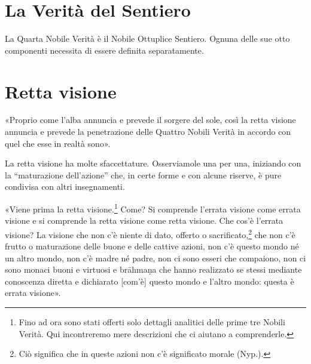 

\hypertarget{x-la-verità-del-sentiero}{\section*{La Verità del Sentiero}}
 La Quarta Nobile Verità è il Nobile Ottuplice
Sentiero. Ognuna delle sue otto componenti necessita di essere definita
separatamente.


\hypertarget{x-retta-visione}{\section*{Retta visione}}
 «Proprio come l’alba annuncia e prevede il sorgere del sole,
così la retta visione annuncia e prevede la penetrazione delle Quattro
Nobili Verità in accordo con quel che esse in realtà sono».




 La retta visione ha molte sfaccettature. Osserviamole
una per una, iniziando con la “maturazione dell’azione” che, in certe
forme e con alcune riserve, è pure condivisa con altri insegnamenti.


 «Viene prima la retta visione.\footnote{Fino ad ora sono stati offerti solo dettagli analitici delle prime tre Nobili Verità. Qui incontreremo mere descrizioni che ci aiutano a comprenderle.} Come? Si
comprende l’errata visione come errata visione e si comprende la retta
visione come retta visione. Che cos’è l’errata visione? La visione che
non c’è niente di dato, offerto o sacrificato,\footnote{Ciò significa che in queste azioni non c’è significato morale (Nyp.).} che
non c’è frutto o maturazione delle buone e delle cattive azioni, non c’è
questo mondo né un altro mondo, non c’è madre né padre, non ci sono
esseri che compaiono, non ci sono monaci buoni e virtuosi e brāhmaṇa che
hanno realizzato se stessi mediante conoscenza diretta e dichiarato
[com’è] questo mondo e l’altro mondo: questa è errata visione».


